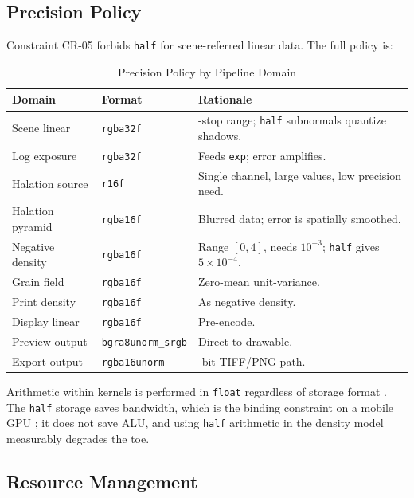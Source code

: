 \subsection{Precision Policy}
\label{sec:precision}

Constraint CR-05 forbids \texttt{half} for scene-referred linear data. The full
policy is:

\begin{table}[htbp]
\caption{Precision Policy by Pipeline Domain}
\label{tab:precision}
\begin{center}
\renewcommand{\arraystretch}{1.15}
\begin{tabularx}{\columnwidth}{@{}ll>{\raggedright\arraybackslash}X@{}}
\toprule
\textbf{Domain} & \textbf{Format} & \textbf{Rationale} \\
\midrule
Scene linear & \texttt{rgba32f} & 18-stop range; \texttt{half} subnormals quantize shadows. \\
Log exposure & \texttt{rgba32f} & Feeds \texttt{exp}; error amplifies. \\
Halation source & \texttt{r16f} & Single channel, large values, low precision need. \\
Halation pyramid & \texttt{rgba16f} & Blurred data; error is spatially smoothed. \\
Negative density & \texttt{rgba16f} & Range $[0,4]$, needs $10^{-3}$; \texttt{half} gives $5\times10^{-4}$. \\
Grain field & \texttt{rgba16f} & Zero-mean unit-variance. \\
Print density & \texttt{rgba16f} & As negative density. \\
Display linear & \texttt{rgba16f} & Pre-encode. \\
Preview output & \texttt{bgra8unorm\_srgb} & Direct to drawable. \\
Export output & \texttt{rgba16unorm} & 16-bit TIFF/PNG path. \\
\bottomrule
\end{tabularx}
\end{center}
\end{table}

Arithmetic within kernels is performed in \texttt{float} regardless of storage
format \cite{metalspec}. The \texttt{half} storage saves bandwidth, which is the
binding constraint on a mobile GPU \cite{metalbest}; it does not save ALU, and
using \texttt{half} arithmetic in the density model measurably degrades the toe.

\subsection{Resource Management}

